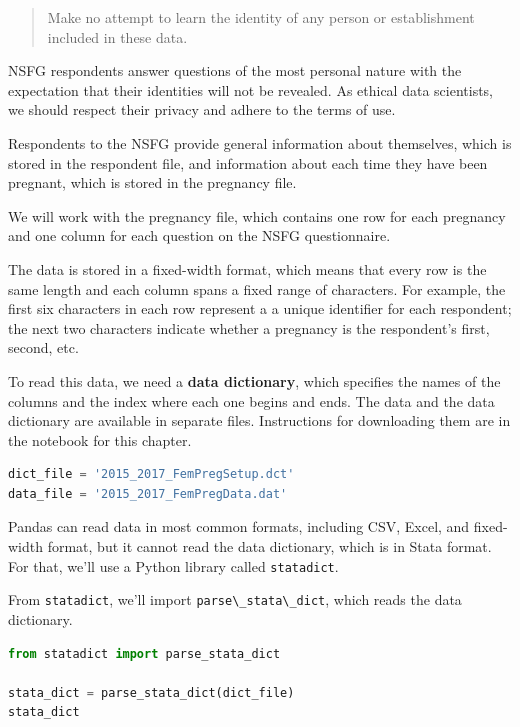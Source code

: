 \begin{quote}
Make no attempt to learn the identity of any person or establishment
included in these data.
\end{quote}

NSFG respondents answer questions of the most personal nature with the
expectation that their identities will not be revealed. As ethical data
scientists, we should respect their privacy and adhere to the terms of
use.

Respondents to the NSFG provide general information about themselves,
which is stored in the respondent file, and information about each time
they have been pregnant, which is stored in the pregnancy file.

We will work with the pregnancy file, which contains one row for each
pregnancy and one column for each question on the NSFG questionnaire.

The data is stored in a fixed-width format, which means that every row
is the same length and each column spans a fixed range of characters.
For example, the first six characters in each row represent a a unique
identifier for each respondent; the next two characters indicate whether
a pregnancy is the respondent's first, second, etc.

To read this data, we need a \textbf{data dictionary}, which specifies
the names of the columns and the index where each one begins and ends.
The data and the data dictionary are available in separate files.
Instructions for downloading them are in the notebook for this chapter.

\begin{lstlisting}[language=Python,style=source]
dict_file = '2015_2017_FemPregSetup.dct'
data_file = '2015_2017_FemPregData.dat'
\end{lstlisting}

Pandas can read data in most common formats, including CSV, Excel, and
fixed-width format, but it cannot read the data dictionary, which is in
Stata format. For that, we'll use a Python library called
\passthrough{\lstinline!statadict!}.

From \passthrough{\lstinline!statadict!}, we'll import
\passthrough{\lstinline!parse\_stata\_dict!}, which reads the data
dictionary.

\begin{lstlisting}[language=Python,style=source]
from statadict import parse_stata_dict

stata_dict = parse_stata_dict(dict_file)
stata_dict
\end{lstlisting}

